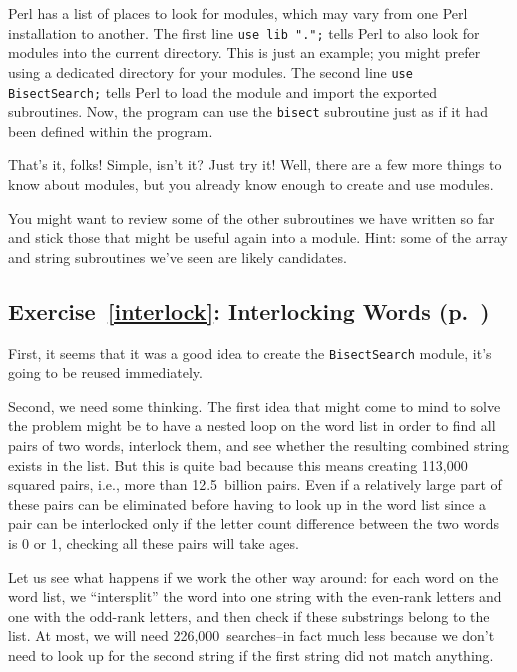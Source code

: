 Perl has a list of places to look for modules, 
which may vary from one Perl installation to another. 
The first line {\tt use lib ".";} tells Perl to also 
look for modules into the current directory. This is 
just an example; you might prefer using a dedicated 
directory for your modules. The 
second line {\tt use BisectSearch;} tells Perl to 
load the module and import the exported subroutines. Now, 
the program can use the {\tt bisect} subroutine just as if 
it had been defined within the program.

That's it, folks! Simple, isn't it? Just try it! Well, there 
are a few more things to know about modules, but you 
already know enough to create and use modules. 

You might want to review some of the other subroutines we 
have written so far and stick those that might be useful 
again into a module. Hint: some of the array and string 
subroutines we've seen are likely candidates.

\subsection{Exercise~\ref{interlock}: Interlocking Words (p.~\pageref{interlock})}
\label{sol_interlock}

First, it seems that it was a good idea to create the 
\verb'BisectSearch' module, it's going to be reused immediately.

Second, we need some thinking. The first idea that might 
come to mind to solve the problem might be to have a 
nested loop on the word list in order to find all pairs 
of two words, interlock them, and see whether the resulting 
combined string exists in the list. But this is quite bad 
because this means creating 113,000 squared pairs, i.e., more 
than 12.5~billion pairs. Even if a relatively large part 
of these pairs can be eliminated before having to look up in 
the word list since a pair can be interlocked only if the 
letter count difference between the two words is 0 or 1, 
checking all these pairs will take ages.

Let us see what happens if we work the other way around: for 
each word on the word list, we ``intersplit'' the word into 
one string with the even-rank letters and one with the odd-rank 
letters, and then check if these substrings belong to the 
list. At most, we will need 226,000~searches--in fact much less 
because we don't need to look up for the second string if the 
first string did not match anything.

